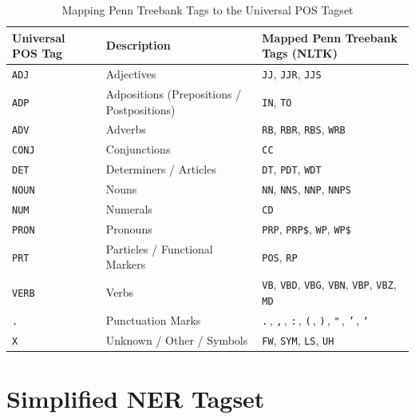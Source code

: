 \documentclass[12pt, a4paper]{article}
\begin{document}
\begin{table}[htbp]
  \centering
  \caption{Mapping Penn Treebank Tags to the Universal POS Tagset}
  \label{tab:pos_mapping}
  \small
  \begin{tabularx}{\textwidth}{>{\centering\arraybackslash}p{2.8cm} X X}
    \toprule
    \textbf{Universal POS Tag} & \textbf{Description} & \textbf{Mapped Penn Treebank Tags (NLTK)} \\
    \midrule
    \texttt{ADJ}  & Adjectives & \texttt{JJ}, \texttt{JJR}, \texttt{JJS} \\
    \addlinespace
    \texttt{ADP}  & Adpositions (Prepositions / Postpositions) & \texttt{IN}, \texttt{TO} \\
    \addlinespace
    \texttt{ADV}  & Adverbs & \texttt{RB}, \texttt{RBR}, \texttt{RBS}, \texttt{WRB} \\
    \addlinespace
    \texttt{CONJ} & Conjunctions & \texttt{CC} \\
    \addlinespace
    \texttt{DET}  & Determiners / Articles & \texttt{DT}, \texttt{PDT}, \texttt{WDT} \\
    \addlinespace
    \texttt{NOUN} & Nouns & \texttt{NN}, \texttt{NNS}, \texttt{NNP}, \texttt{NNPS} \\
    \addlinespace
    \texttt{NUM}  & Numerals & \texttt{CD} \\
    \addlinespace
    \texttt{PRON} & Pronouns & \texttt{PRP}, \texttt{PRP\$}, \texttt{WP}, \texttt{WP\$} \\
    \addlinespace
    \texttt{PRT}  & Particles / Functional Markers & \texttt{POS}, \texttt{RP} \\
    \addlinespace
    \texttt{VERB} & Verbs & \texttt{VB}, \texttt{VBD}, \texttt{VBG}, \texttt{VBN}, \texttt{VBP}, \texttt{VBZ}, \texttt{MD} \\
    \addlinespace
    \texttt{.}    & Punctuation Marks & \texttt{.}\,, \texttt{,}\,, \texttt{:}\,, \texttt{(}\,, \texttt{)}\,, \texttt{"}\,, \texttt{'}\,, \texttt{`} \\
    \addlinespace
    \texttt{X}    & Unknown / Other / Symbols & \texttt{FW}, \texttt{SYM}, \texttt{LS}, \texttt{UH} \\
    \bottomrule
  \end{tabularx}
\end{table}


\newpage
\section{Simplified NER Tagset}
\label{app:ner_mapping}
\end{document}
